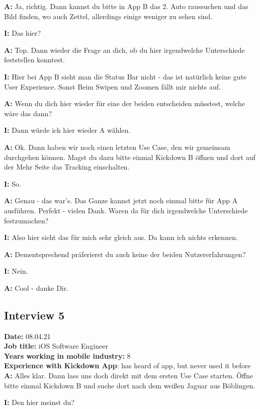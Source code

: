 \begin{myparindent}{0pt}
\textbf{A:} Ja, richtig. Dann kannst du bitte in App B das 2. Auto raussuchen und das Bild finden, wo auch Zettel, allerdings einige weniger zu sehen sind. 

\textbf{I:} Das hier?

\textbf{A:} Top. Dann wieder die Frage an dich, ob du hier irgendwelche Unterschiede feststellen konntest. 

\textbf{I:} Hier bei App B sieht man die Status Bar nicht - das ist natürlich keine gute User Experience. Sonst Beim Swipen und Zoomen fällt mir nichts auf. 

\textbf{A:} Wenn du dich hier wieder für eine der beiden entscheiden müsstest, welche wäre das dann?

\textbf{I:} Dann würde ich hier wieder A wählen. 

\textbf{A:} Ok. Dann haben wir noch einen letzten Use Case, den wir gemeinsam durchgehen können. Magst du dazu bitte einmal Kickdown B öffnen und dort auf der Mehr Seite das Tracking einschalten. 

\textbf{I:} So.

\textbf{A:} Genau - das war's. Das Ganze kannst jetzt noch einmal bitte für App A ausführen. Perfekt - vielen Dank. Waren da für dich irgendwelche Unterschiede festzumachen?

\textbf{I:} Also hier sieht das für mich sehr gleich aus. Da kann ich nichts erkennen. 

\textbf{A:} Dementsprechend präferierst du auch keine der beiden Nutzererfahrungen?

\textbf{I:} Nein. 

\textbf{A:} Cool - danke Dir.


\subsection{Interview 5}
\textbf{Date:} 08.04.21\\
\textbf{Job title:} iOS Software Engineer\\
\textbf{Years working in mobile industry:} 8\\
\textbf{Experience with Kickdown App}: has heard of app, but never used it before\\

\textbf{A:} Alles klar. Dann lass uns doch direkt mit dem ersten Use Case starten. Öffne bitte einmal Kickdown B und suche dort nach dem weißen Jaguar aus Böblingen. 

\textbf{I:} Den hier meinst du?


\end{myparindent}
